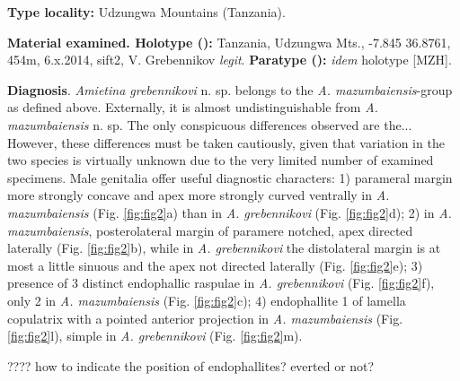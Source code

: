 \documentclass[fleqn,10pt,lineno]{wlpeerj}
\begin{document}
\textbf{Type locality:} Udzungwa Mountains (Tanzania).

\textbf{Material examined. Holotype (\male):} Tanzania, Udzungwa Mts., -7.845 36.8761, 454m, 6.x.2014, sift2, V. Grebennikov \textit{legit}. \textbf{Paratype (\male):} \textit{idem} holotype [MZH].

\textbf{Diagnosis}. \textit{Amietina grebennikovi} n. sp. belongs to the \textit{A. mazumbaiensis}-group as defined above. Externally, it is almost undistinguishable from \textit{A. mazumbaiensis} n. sp. The only conspicuous differences observed are the... 
However, these differences must be taken cautiously, given that variation in the two species is virtually unknown due to the very limited number of examined specimens. Male genitalia offer useful diagnostic characters: 1) parameral margin more strongly concave and apex more strongly curved ventrally in \textit{A. mazumbaiensis} (Fig. \ref{fig:fig2}a) than in \textit{A. grebennikovi} (Fig. \ref{fig:fig2}d); 2) in \textit{A. mazumbaiensis}, posterolateral margin of paramere notched, apex directed laterally (Fig. \ref{fig:fig2}b), while in \textit{A. grebennikovi} the distolateral margin is at most a little sinuous and the apex not directed laterally (Fig. \ref{fig:fig2}e); 3) presence of 3 distinct endophallic raspulae in \textit{A. grebennikovi} (Fig. \ref{fig:fig2}f), only 2 in \textit{A. mazumbaiensis} (Fig. \ref{fig:fig2}c); 4) endophallite 1 of lamella copulatrix with a pointed anterior projection in \textit{A. mazumbaiensis} (Fig. \ref{fig:fig2}l), simple in \textit{A. grebennikovi} (Fig. \ref{fig:fig2}m).

???? how to indicate the position of endophallites? everted or not?
\end{document}
